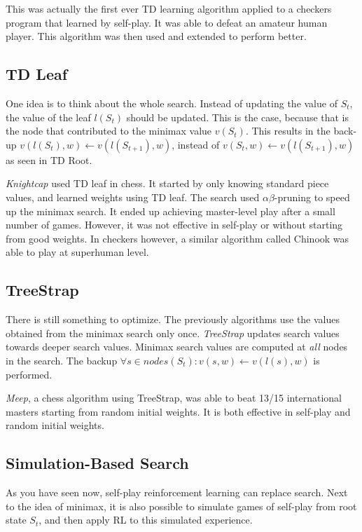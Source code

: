 This was actually the first ever TD learning algorithm applied to a checkers program that learned by self-play. It was able to defeat an amateur human player. This algorithm was then used and extended to perform better.

\subsection{TD Leaf}

One idea is to think about the whole search. Instead of updating the value of $S_t$, the value of the leaf $l(S_t)$ should be updated. This is the case, because that is the node that contributed to the minimax value $v(S_t)$. This results in the back-up $v(l(S_t), w) \leftarrow v(l(S_{t+1}), w)$, instead of $v(S_t, w) \leftarrow v(l(S_{t+1}), w)$ as seen in TD Root.

\textit{Knightcap} used TD leaf in chess. It started by only knowing standard piece values, and learned weights using TD leaf. The search used $\alpha\beta$-pruning to speed up the minimax search. It ended up achieving master-level play after a small number of games. However, it was not effective in self-play or without starting from good weights. In checkers however, a similar algorithm called Chinook was able to play at superhuman level.

\subsection{TreeStrap}

There is still something to optimize. The previously algorithms use the values obtained from the minimax search only once. \textit{TreeStrap} updates search values towards deeper search values. Minimax search values are computed at \textit{all} nodes in the search. The backup $\forall s \in nodes(S_t): v(s, w) \leftarrow v(l(s), w)$ is performed.

\textit{Meep}, a chess algorithm using TreeStrap, was able to beat 13/15 international masters starting from random initial weights. It is both effective in self-play and random initial weights.

\subsection{Simulation-Based Search}

As you have seen now, self-play reinforcement learning can replace search. Next to the idea of minimax, it is also possible to simulate games of self-play from root state $S_t$, and then apply RL to this simulated experience.

